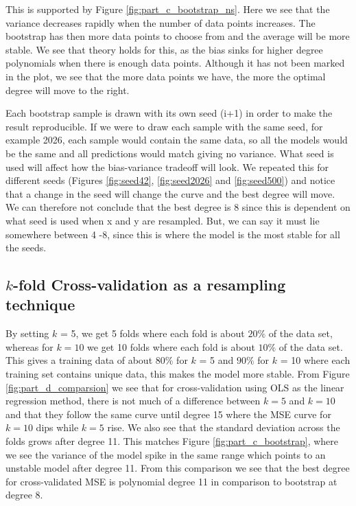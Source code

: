 \documentclass[reprint,english,notitlepage]{revtex4-2}  %
\begin{document}
This is supported by Figure \ref{fig:part_c_bootstrap_ns}. Here we see that the variance decreases rapidly when the number of data points increases. The bootstrap has then more data points to choose from and the average will be more stable. We see that theory holds for this, as the bias sinks for higher degree polynomials when there is enough data points. Although it has not been marked in the plot, we see that the more data points we have, the more the optimal degree will move to the right. 

Each bootstrap sample is drawn with its own seed (i+1) in order to make the result reproducible. If we were to draw each sample with the same seed, for example 2026, each sample would contain the same data, so all the models would be the same and all predictions would match giving no variance. What seed is used will affect how the bias-variance tradeoff will look. We repeated this for different seeds (Figures \ref{fig:seed42}, \ref{fig:seed2026} and  \ref{fig:seed500}) and notice that a change in the seed will change the curve and the best degree will move. We can therefore not conclude that the best degree is 8 since this is dependent on what seed is used when x and y are resampled. But, we can say it must lie somewhere between 4 -8, since this is where the model is the most stable for all the seeds.  


\subsection{$k$-fold Cross-validation as a resampling technique}\label{sec:k-foldCV} %

By setting $k$ = 5, we get 5 folds where each fold is about $20\%$ of the data set, whereas for $k=10$ we get 10 folds where each fold is about $10\%$ of the data set. This gives a training data of about $80\%$ for $k$ = 5 and $90\%$ for $k$ = 10 where each training set contains unique data, this makes the model more stable. From Figure \ref{fig:part_d_comparsion} we see that for cross-validation using OLS as the linear regression method, there is not much of a difference between $k=5$ and $k=10$ and that they follow the same curve until degree 15 where the MSE curve for $k = 10$ dips while $k=5$ rise. We also see that the standard deviation across the folds grows after degree 11. This matches Figure \ref{fig:part_c_bootstrap}, where we see the variance of the model spike in the same range which points to an unstable model after degree 11. From this comparison we see that the best degree for cross-validated MSE is polynomial degree 11 in comparison to bootstrap at degree 8. 
\end{document}
